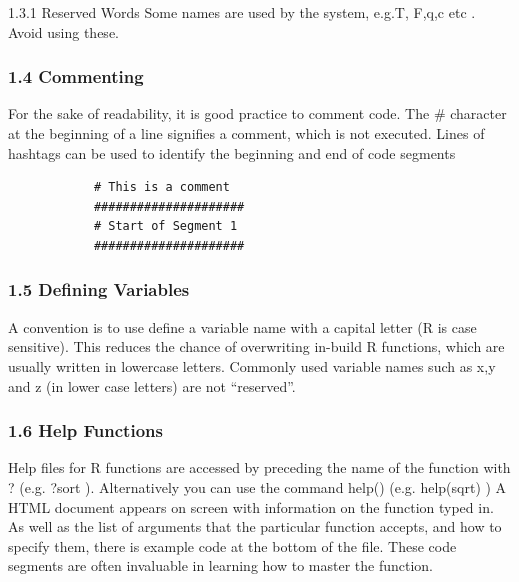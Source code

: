 \documentclass{beamer}
\begin{document}
	\begin{frame}
		
		1.3.1 Reserved Words
		Some names are used by the system, e.g.T, F,q,c etc . Avoid using these.
	\end{frame}
	\begin{frame}[fragile]
		\frametitle{1.4 Commenting}
		For the sake of readability, it is good practice to comment code. The \# character at the
		beginning of a line signifies a comment, which is not executed. Lines of hashtags can be used
		to identify the beginning and end of code segments
		\begin{framed}
			\begin{verbatim}
			# This is a comment
			#####################
			# Start of Segment 1
			#####################
			\end{verbatim}
		\end{framed}
	\end{frame}
	\begin{frame}
		\frametitle{1.5 Defining Variables}
		A convention is to use define a variable name with a capital letter (R is case sensitive). This
		reduces the chance of overwriting in-build R functions, which are usually written in lowercase
		letters. Commonly used variable names such as x,y and z (in lower case letters) are not “reserved”.
	\end{frame}
	\begin{frame}
		
		\frametitle{1.6 Help Functions}
		Help files for R functions are accessed by preceding the name of the function with ? (e.g. ?sort
		). Alternatively you can use the command help() (e.g. help(sqrt) )
		A HTML document appears on screen with information on the function typed in. As well
		as the list of arguments that the particular function accepts, and how to specify them, there is
		example code at the bottom of the file. These code segments are often invaluable in learning
		how to master the function.
		
	\end{frame}
\end{document}
